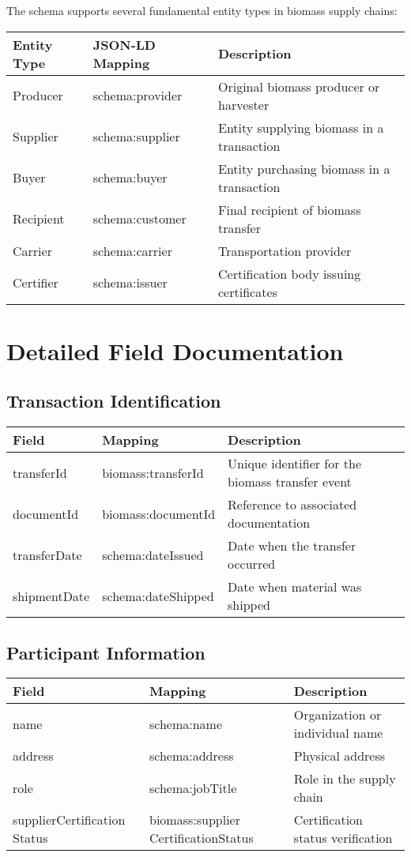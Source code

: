 \documentclass{article}
\begin{document}
The schema supports several fundamental entity types in biomass supply chains:

\begin{longtable}{|p{3cm}|p{4cm}|p{7cm}|}
\hline
\textbf{Entity Type} & \textbf{JSON-LD Mapping} & \textbf{Description} \\
\hline
Producer & schema:provider & Original biomass producer or harvester \\
Supplier & schema:supplier & Entity supplying biomass in a transaction \\
Buyer & schema:buyer & Entity purchasing biomass in a transaction \\
Recipient & schema:customer & Final recipient of biomass transfer \\
Carrier & schema:carrier & Transportation provider \\
Certifier & schema:issuer & Certification body issuing certificates \\
\hline
\end{longtable}

\section{Detailed Field Documentation}

\subsection{Transaction Identification}

\begin{longtable}{|p{3.5cm}|p{3cm}|p{7.5cm}|}
\hline
\textbf{Field} & \textbf{Mapping} & \textbf{Description} \\
\hline
transferId & biomass:transferId & Unique identifier for the biomass transfer event \\
documentId & biomass:documentId & Reference to associated documentation \\
transferDate & schema:dateIssued & Date when the transfer occurred \\
shipmentDate & schema:dateShipped & Date when material was shipped \\
\hline
\end{longtable}

\subsection{Participant Information}

\begin{longtable}{|p{3.5cm}|p{3cm}|p{7.5cm}|}
\hline
\textbf{Field} & \textbf{Mapping} & \textbf{Description} \\
\hline
name & schema:name & Organization or individual name \\
address & schema:address & Physical address \\
role & schema:jobTitle & Role in the supply chain \\
supplierCertification Status & biomass:supplier CertificationStatus & Certification status verification \\
\hline
\end{longtable}
\end{document}
